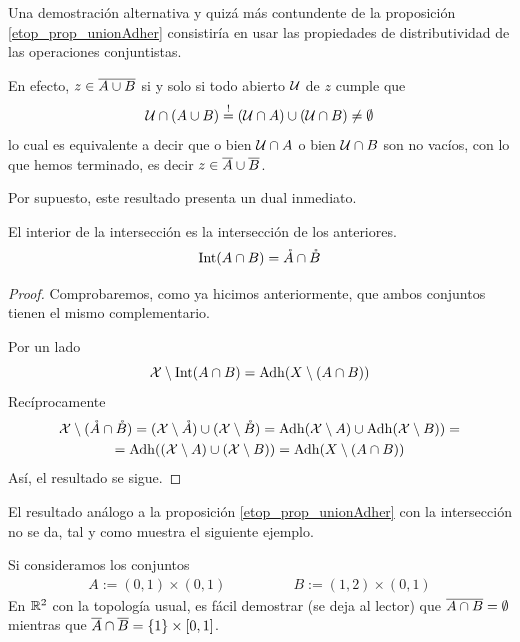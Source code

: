 \begin{obs}
	Una demostración alternativa y quizá más contundente de la proposición \ref{etop_prop_unionAdher} consistiría en usar las propiedades de distributividad de las operaciones conjuntistas.
	
	En efecto, $z\in\overline{A\cup B}$ si y solo si todo abierto $\mathcal{U}$ de $z$ cumple que
	\begin{equation*}
		\mathcal{U}\cap(A\cup B)\stackrel{!}{=}(\mathcal{U}\cap A)\cup(\mathcal{U}\cap B)\not=\emptyset
	\end{equation*}
	lo cual es equivalente a decir que o bien $\mathcal{U}\cap A$ o bien $\mathcal{U}\cap B$ son no vacíos, con lo que hemos terminado, es decir $z\in\overline{A}\cup\overline{B}$.
\end{obs}
Por supuesto, este resultado presenta un dual inmediato.
\begin{cor}
	El interior de la intersección es la intersección de los anteriores.
	\begin{equation*}
	\operatorname{\mathrm{Int}}(A\cap B)=\mathring{A}\cap\mathring{B}
	\end{equation*}
\end{cor}
\begin{proof}
	Comprobaremos, como ya hicimos anteriormente, que ambos conjuntos tienen el mismo complementario.
	
	Por un lado
	\begin{equation*}
	\mathcal{X} \setminus \operatorname{\mathrm{Int}}(A\cap B)=\operatorname{\mathrm{Adh}}(X\setminus (A\cap B))
	\end{equation*}
	Recíprocamente
	\begin{multline*}
	\mathcal{X} \setminus (\mathring{A}\cap \mathring{B})=(\mathcal{X} \setminus \mathring{A})\cup(\mathcal{X} \setminus \mathring{B})=\operatorname{\mathrm{Adh}}(\mathcal{X} \setminus A)\cup \operatorname{\mathrm{Adh}}(\mathcal{X} \setminus B))=\\=\operatorname{\mathrm{Adh}}((\mathcal{X} \setminus A) \cup (\mathcal{X} \setminus B))=\operatorname{\mathrm{Adh}}(X\setminus (A\cap B))
	\end{multline*}
	Así, el resultado se sigue.
\end{proof}
El resultado análogo a la proposición \ref{etop_prop_unionAdher} con la intersección no se da, tal y como muestra el siguiente ejemplo.
\begin{exa}
	\label{etop_ejem_cuadradosAbiertos}
	Si consideramos los conjuntos
	\begin{equation*}
	\begin{array}{cc}
	A:=(0,1)\times(0,1)\qquad&\qquad B:=(1,2)\times(0,1)
	\end{array}
	\end{equation*}
	En $\mathbb{R}^2$ con la topología usual, es fácil demostrar (se deja al lector) que $\overline{A\cap B}=\emptyset$ mientras que $\overline{A}\cap\overline{B}=\{1\}\times[0,1]$.
\end{exa}
